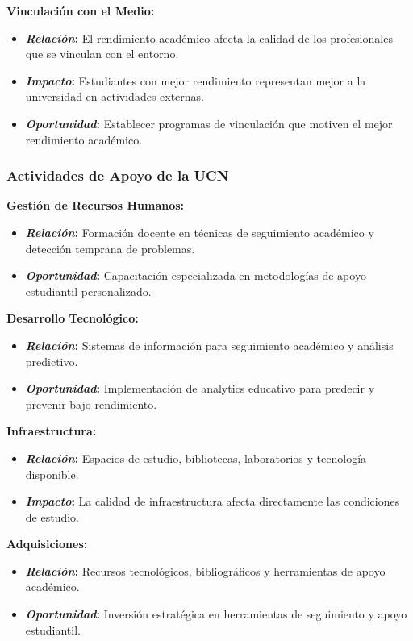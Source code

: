 \documentclass[12pt,letterpaper]{report}
\begin{document}
\textbf{Vinculación con el Medio:}
\begin{itemize}
    \item \textbf{\textit{Relación}:} El rendimiento académico afecta la calidad de los profesionales que se vinculan con el entorno.
    \item \textbf{\textit{Impacto}:} Estudiantes con mejor rendimiento representan mejor a la universidad en actividades externas.
    \item \textbf{\textit{Oportunidad}:} Establecer programas de vinculación que motiven el mejor rendimiento académico.
\end{itemize}

\subsubsection{Actividades de Apoyo de la UCN}

\textbf{Gestión de Recursos Humanos:}
\begin{itemize}
    \item \textbf{\textit{Relación}:} Formación docente en técnicas de seguimiento académico y detección temprana de problemas.
    \item \textbf{\textit{Oportunidad}:} Capacitación especializada en metodologías de apoyo estudiantil personalizado.
\end{itemize}

\textbf{Desarrollo Tecnológico:}
\begin{itemize}
    \item \textbf{\textit{Relación}:} Sistemas de información para seguimiento académico y análisis predictivo.
    \item \textbf{\textit{Oportunidad}:} Implementación de analytics educativo para predecir y prevenir bajo rendimiento.
\end{itemize}

\textbf{Infraestructura:}
\begin{itemize}
    \item \textbf{\textit{Relación}:} Espacios de estudio, bibliotecas, laboratorios y tecnología disponible.
    \item \textbf{\textit{Impacto}:} La calidad de infraestructura afecta directamente las condiciones de estudio.
\end{itemize}

\textbf{Adquisiciones:}
\begin{itemize}
    \item \textbf{\textit{Relación}:} Recursos tecnológicos, bibliográficos y herramientas de apoyo académico.
    \item \textbf{\textit{Oportunidad}:} Inversión estratégica en herramientas de seguimiento y apoyo estudiantil.
\end{itemize}
\end{document}
